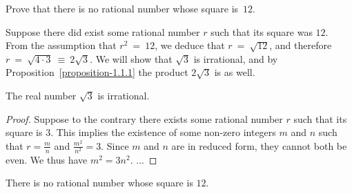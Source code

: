 \begin{exercise}
	Prove that there is no rational number whose square is~$12$.
\end{exercise}
Suppose there did exist some rational number $r$ such that its square was $12$. From the assumption that $r^2~=~12$, we deduce that $r~=~\sqrt{12}$, and therefore $r~=~\sqrt{4 \cdot 3}~\equiv~2\sqrt{3}$. We will show that $\sqrt{3}$ is irrational, and by Proposition~\ref{proposition-1.1.1} the product $2\sqrt{3}$ is as well.

\begin{proposition}
	The real number $\sqrt{3}$ is irrational.
\end{proposition}
\begin{proof}
	Suppose to the contrary there exists some rational number $r$ such that its square is $3$. This implies the existence of some non-zero integers $m$ and $n$ such that $r=\frac{m}{n}$ and $\frac{m^2}{n^2}=3$. Since $m$ and $n$ are in reduced form, they cannot both be even.
	\newline\newline
	We thus have $m^2=3n^2$. ...
	\proofincomplete
\end{proof}

\begin{proposition}
	There is no rational number whose square is $12$.
\end{proposition}

